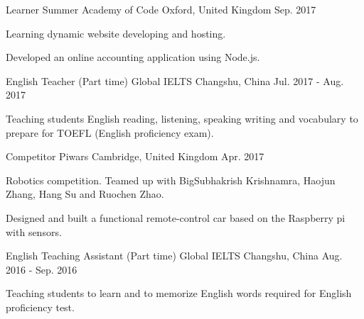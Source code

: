 \begin{cventries}
    \cventry
    {Learner} %
    {Summer Academy of Code} %
    {Oxford, United Kingdom} %
    {Sep. 2017} %
    {
      \begin{cvitems} %
        \item {Learning dynamic website developing and hosting.}
        \item {Developed an online accounting application using Node.js.}
      \end{cvitems}
    }

  \cventry
    {English Teacher (Part time)} %
    {Global IELTS} %
    {Changshu, China} %
    {Jul. 2017 - Aug. 2017} %
    {
      \begin{cvitems} %
        \item {Teaching students English reading, listening, speaking writing and vocabulary to prepare for TOEFL (English
        proficiency exam).}
      \end{cvitems}
    }
    
    \cventry
    {Competitor} %
    {Piwars} %
    {Cambridge, United Kingdom} %
    {Apr. 2017} %
    {
      \begin{cvitems} %
        \item {Robotics competition. Teamed up with BigSubhakrish Krishnamra, Haojun Zhang, Hang Su and Ruochen Zhao.}
        \item {Designed and built a functional remote-control car based on the Raspberry pi with sensors.}
      \end{cvitems}
    }

  \cventry
    {English Teaching Assistant (Part time)} %
    {Global IELTS} %
    {Changshu, China} %
    {Aug. 2016 - Sep. 2016} %
    {
      \begin{cvitems} %
        \item {Teaching students to learn and to memorize English words required for English proficiency test.}
      \end{cvitems}
    }
    
\end{cventries}
